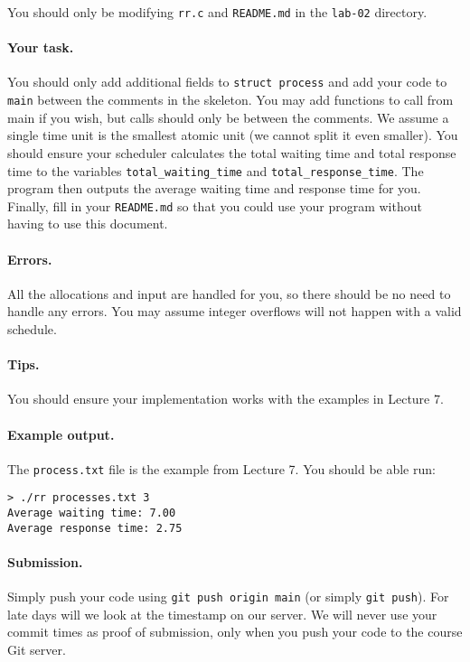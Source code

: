 You should only be modifying \texttt{rr.c} and \texttt{README.md} in the
\texttt{lab-02} directory.

\paragraph{Your task.}

You should only add additional fields to \texttt{struct process} and add your
code to \texttt{main} between the comments in the skeleton. You may add
functions to call from main if you wish, but calls should only be between the
comments. We assume a single time unit is the smallest atomic unit (we cannot
split it even smaller).
You should ensure your scheduler calculates the total waiting time and total
response time to the variables \texttt{total\_waiting\_time} and
\texttt{total\_response\_time}.
The program then outputs the average waiting time and response time for you.
Finally, fill in your \texttt{README.md} so that you could use your program
without having to use this document.

\paragraph{Errors.}

All the allocations and input are handled for you, so there should be no need to
handle any errors.
You may assume integer overflows will not happen with a valid schedule.

\paragraph{Tips.}

You should ensure your implementation works with the examples in Lecture 7.

\paragraph{Example output.}

The \texttt{process.txt} file is the example from Lecture 7. You should be able
run:

\begin{lstlisting}
> ./rr processes.txt 3
Average waiting time: 7.00             
Average response time: 2.75
\end{lstlisting}

\paragraph{Submission.}

Simply push your code using \lstinline|git push origin main| (or simply
\lstinline|git push|).
For late days will we look at the timestamp on our server.
We will never use your commit times as proof of submission, only when you
push your code to the course Git server.


